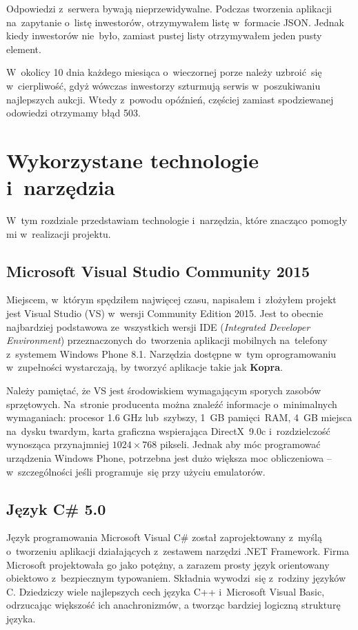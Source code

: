 \documentclass[a4paper,twoside,titlepage,openright]{book}
\begin{document}
Odpowiedzi z~serwera bywają nieprzewidywalne. Podczas tworzenia aplikacji na~zapytanie o~listę inwestorów, otrzymywałem listę w~formacie JSON. Jednak kiedy inwestorów nie~było, zamiast pustej listy otrzymywałem jeden pusty element. 

W~okolicy 10 dnia każdego miesiąca o~wieczornej porze należy uzbroić~się w~cierpliwość, gdyż wówczas inwestorzy szturmują serwis w~poszukiwaniu najlepszych aukcji. Wtedy z~powodu opóźnień, częściej zamiast spodziewanej odowiedzi otrzymamy błąd 503.


\chapter{Wykorzystane technologie i~narzędzia}
W~tym rozdziale przedstawiam technologie i~narzędzia, które znacząco pomogły mi w~realizacji projektu.

\section{Microsoft Visual Studio Community 2015}
Miejscem, w~którym spędziłem najwięcej czasu, napisałem i~złożyłem projekt jest Visual Studio (VS) w~wersji Community Edition 2015. Jest to obecnie najbardziej podstawowa ze~wszystkich wersji IDE (\textit{Integrated Developer Environment}) przeznaczonych do~tworzenia aplikacji mobilnych na~telefony z~systemem Windows Phone 8.1. Narzędzia dostępne w~tym oprogramowaniu w~zupełności wystarczają, by tworzyć aplikacje takie jak \textbf{Kopra}. 

Należy pamiętać, że VS jest środowiskiem wymagającym sporych zasobów sprzętowych. Na~stronie producenta \cite{vs} można znaleźć informacje o~minimalnych wymaganiach: procesor 1.6 GHz lub~szybszy, 1~GB pamięci~RAM, 4~GB miejsca na~dysku twardym, karta graficzna wspierająca DirectX~9.0c i~rozdzielczość wynosząca przynajmniej $ 1024 \times 768 $ pikseli. Jednak aby móc programować urządzenia Windows Phone, potrzebna jest dużo większa moc obliczeniowa -- w~szczególności jeśli programuje~się przy użyciu emulatorów.

\section{Język C\# 5.0}
Język programowania Microsoft Visual C\# został zaprojektowany z~myślą o~tworzeniu aplikacji działających z~zestawem narzędzi .NET Framework. Firma Microsoft projektowała go jako potężny, a zarazem prosty język orientowany obiektowo z~bezpiecznym typowaniem.\cite{csharp} Składnia wywodzi~się z~rodziny języków C. Dziedziczy wiele najlepszych cech języka C++ i~Microsoft Visual Basic, odrzucając większość ich anachronizmów, a tworząc bardziej logiczną strukturę języka. 
\end{document}
